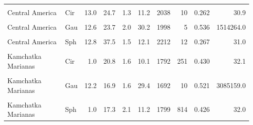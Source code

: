 \begin{ThreePartTable}
\begin{longtable}[t]{llrrrrrrrr}
\cellcolor{gray!6}{Central America} & \cellcolor{gray!6}{Bes} & \cellcolor{gray!6}{12.2} & \cellcolor{gray!6}{23.6} & \cellcolor{gray!6}{1.5} & \cellcolor{gray!6}{17.1} & \cellcolor{gray!6}{1985} & \cellcolor{gray!6}{3} & \cellcolor{gray!6}{0.280} & \cellcolor{gray!6}{33.3}\\
Central America & Cir & 13.0 & 24.7 & 1.3 & 11.2 & 2038 & 10 & 0.262 & 30.9\\
\cellcolor{gray!6}{Central America} & \cellcolor{gray!6}{Exp} & \cellcolor{gray!6}{12.5} & \cellcolor{gray!6}{27.1} & \cellcolor{gray!6}{1.5} & \cellcolor{gray!6}{11.8} & \cellcolor{gray!6}{2076} & \cellcolor{gray!6}{5} & \cellcolor{gray!6}{0.266} & \cellcolor{gray!6}{30.7}\\
Central America & Gau & 12.6 & 23.7 & 2.0 & 30.2 & 1998 & 5 & 0.536 & 1514264.0\\
\cellcolor{gray!6}{Central America} & \cellcolor{gray!6}{Lin} & \cellcolor{gray!6}{12.9} & \cellcolor{gray!6}{25.9} & \cellcolor{gray!6}{1.6} & \cellcolor{gray!6}{17.0} & \cellcolor{gray!6}{2048} & \cellcolor{gray!6}{8} & \cellcolor{gray!6}{0.267} & \cellcolor{gray!6}{31.0}\\
Central America & Sph & 12.8 & 37.5 & 1.5 & 12.1 & 2212 & 12 & 0.267 & 31.0\\
\cellcolor{gray!6}{Kamchatka Marianas} & \cellcolor{gray!6}{Bes} & \cellcolor{gray!6}{11.5} & \cellcolor{gray!6}{22.7} & \cellcolor{gray!6}{1.6} & \cellcolor{gray!6}{12.2} & \cellcolor{gray!6}{1725} & \cellcolor{gray!6}{5} & \cellcolor{gray!6}{0.458} & \cellcolor{gray!6}{32.2}\\
Kamchatka Marianas & Cir & 1.0 & 20.8 & 1.6 & 10.1 & 1792 & 251 & 0.430 & 32.1\\
\cellcolor{gray!6}{Kamchatka Marianas} & \cellcolor{gray!6}{Exp} & \cellcolor{gray!6}{11.1} & \cellcolor{gray!6}{23.7} & \cellcolor{gray!6}{1.6} & \cellcolor{gray!6}{10.9} & \cellcolor{gray!6}{1726} & \cellcolor{gray!6}{7} & \cellcolor{gray!6}{0.461} & \cellcolor{gray!6}{30.9}\\
Kamchatka Marianas & Gau & 12.2 & 16.9 & 1.6 & 29.4 & 1692 & 10 & 0.521 & 3085159.0\\
\cellcolor{gray!6}{Kamchatka Marianas} & \cellcolor{gray!6}{Lin} & \cellcolor{gray!6}{15.2} & \cellcolor{gray!6}{33.4} & \cellcolor{gray!6}{1.6} & \cellcolor{gray!6}{10.0} & \cellcolor{gray!6}{1796} & \cellcolor{gray!6}{11} & \cellcolor{gray!6}{0.458} & \cellcolor{gray!6}{31.3}\\
Kamchatka Marianas & Sph & 1.0 & 17.3 & 2.1 & 11.2 & 1799 & 814 & 0.426 & 32.0\\

\end{longtable}
\end{ThreePartTable}
